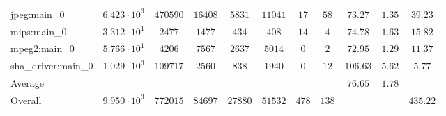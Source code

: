 \begin{tabular}{|l|c|c|c|c|c|c|c|c|c|c|}
jpeg:main\_0            & $ 6.423 \cdot 10^{3} $ & $ 470590 $ & $ 16408 $ & $ 5831  $ & $ 11041 $ & $ 17  $ & $ 58  $ & $ 73.27       $ & $ 1.35    $ & $ 39.23   $ \\
mips:main\_0            & $ 3.312 \cdot 10^{1} $ & $ 2477   $ & $ 1477  $ & $ 434   $ & $ 408   $ & $ 14  $ & $ 4   $ & $ 74.78       $ & $ 1.63    $ & $ 15.82   $ \\
mpeg2:main\_0           & $ 5.766 \cdot 10^{1} $ & $ 4206   $ & $ 7567  $ & $ 2637  $ & $ 5014  $ & $ 0   $ & $ 2   $ & $ 72.95       $ & $ 1.29    $ & $ 11.37   $ \\
sha\_driver:main\_0     & $ 1.029 \cdot 10^{3} $ & $ 109717 $ & $ 2560  $ & $ 838   $ & $ 1940  $ & $ 0   $ & $ 12  $ & $ 106.63      $ & $ 5.62    $ & $ 5.77    $ \\
\hline
Average                 & $                    $ & $        $ & $       $ & $       $ & $       $ & $     $ & $     $ & $ 76.65       $ & $ 1.78    $ & $         $ \\
\hline
Overall                 & $ 9.950 \cdot 10^{3} $ & $ 772015 $ & $ 84697 $ & $ 27880 $ & $ 51532 $ & $ 478 $ & $ 138 $ & $             $ & $         $ & $ 435.22  $ \\
\hline
\end{tabular}
